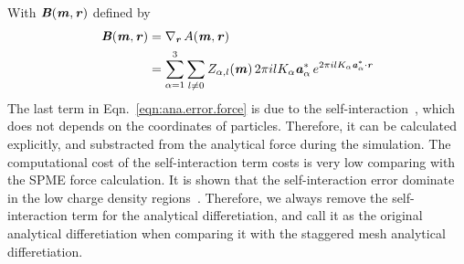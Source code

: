 \documentclass[aps,pre,preprint]{revtex4}
\renewcommand{\v}[1]{\textbf{\textit{#1}}}
\begin{document}
With $\v B(\v m, \v r)$ defined by
\begin{align}\nonumber
  \v B(\v m, \v r)
  &=
  \nabla_{\v r}\,A(\v m, \v r)\\
  &=
  \sum_{\alpha=1}^3\sum_{l\neq 0}
  Z_{\alpha,l}(\v m)\,
  2\pi i l K_\alpha\v a_\alpha^\ast\,e^{2\pi i l K_\alpha\v a^\ast_\alpha\cdot \v r} 
\end{align}
The last term in Eqn.~\eqref{eqn:ana.error.force} is due to the
self-interaction~\cite{cerutti2009staggered, ballenegger2011removal,
  neelov2010interlaced}, which does not depends on the coordinates of
particles. Therefore, it can be calculated explicitly, and substracted
from the analytical force during the simulation. The computational cost of
the self-interaction term costs is very low comparing with the SPME
force calculation. It is shown that the self-interaction  error
dominate in the low charge density regions~\cite{cerutti2009staggered}.
Therefore, we always remove the self-interaction term for
the analytical differetiation, and call it as the original analytical
differetiation when comparing it with the staggered mesh analytical
differetiation.
\end{document}
